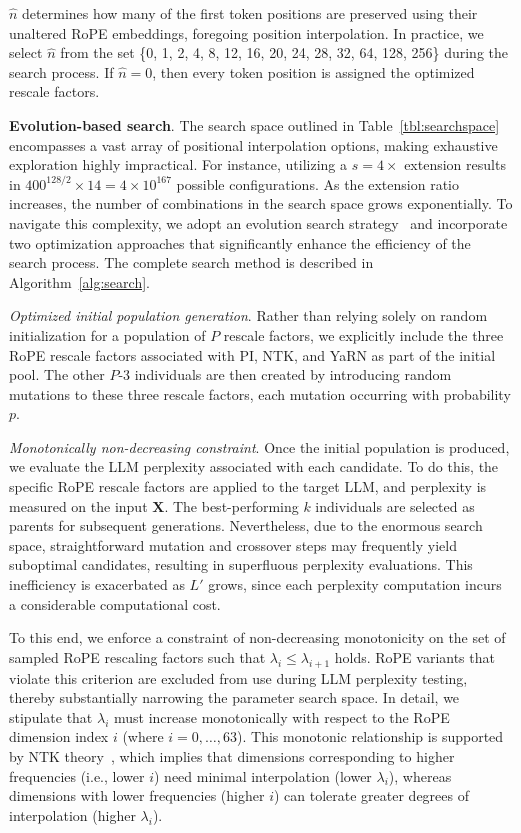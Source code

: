 $\hat{n}$ determines how many of the first token positions are preserved using their unaltered RoPE embeddings, foregoing position interpolation. In practice, we select $\hat{n}$ from the set \{0, 1, 2, 4, 8, 12, 16, 20, 24, 28, 32, 64, 128, 256\} during the search process. If $\hat{n}=0$, then every token position is assigned the optimized rescale factors.

\textbf{Evolution-based search}. The search space outlined in Table~\ref{tbl:searchspace} encompasses a vast array of positional interpolation options, making exhaustive exploration highly impractical. For instance, utilizing a $s=4\times$ extension results in $400^{128/2}\times14=4\times10^{167}$ possible configurations. As the extension ratio increases, the number of combinations in the search space grows exponentially. To navigate this complexity, we adopt an evolution search strategy~\cite{guo2020single} and incorporate two optimization approaches that significantly enhance the efficiency of the search process. The complete search method is described in Algorithm~\ref{alg:search}.

\textit{Optimized initial population generation}. Rather than relying solely on random initialization for a population of $P$ rescale factors, we explicitly include the three RoPE rescale factors associated with PI, NTK, and YaRN as part of the initial pool. The other $P$-3 individuals are then created by introducing random mutations to these three rescale factors, each mutation occurring with probability $p$.

\textit{Monotonically non-decreasing constraint}. Once the initial population is produced, we evaluate the LLM perplexity associated with each candidate. To do this, the specific RoPE rescale factors are applied to the target LLM, and perplexity is measured on the input $\mathbf{X}$. The best-performing $k$ individuals are selected as parents for subsequent generations. Nevertheless, due to the enormous search space, straightforward mutation and crossover steps may frequently yield suboptimal candidates, resulting in superfluous perplexity evaluations. This inefficiency is exacerbated as $L'$ grows, since each perplexity computation incurs a considerable computational cost.

To this end, we enforce a constraint of non-decreasing monotonicity on the set of sampled RoPE rescaling factors such that $\lambda_i\le \lambda_{i+1}$ holds. RoPE variants that violate this criterion are excluded from use during LLM perplexity testing, thereby substantially narrowing the parameter search space. In detail, we stipulate that $\lambda_i$ must increase monotonically with respect to the RoPE dimension index $i$ (where $i=0,\ldots,63$). This monotonic relationship is supported by NTK theory~\cite{jacot2018neural,tancik2020fourier,ntk}, which implies that dimensions corresponding to higher frequencies (i.e., lower $i$) need minimal interpolation (lower $\lambda_i$), whereas dimensions with lower frequencies (higher $i$) can tolerate greater degrees of interpolation (higher $\lambda_i$).

